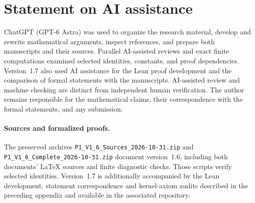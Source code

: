 \section*{Statement on AI assistance}

ChatGPT (GPT-6 Astra) was used to organize the research material,
develop and rewrite mathematical arguments, inspect references,
and prepare both manuscripts and their sources.
Parallel AI-assisted reviews and exact finite computations examined
selected identities, constants, and proof dependencies.
Version~1.7 also used AI assistance for the Lean proof development and
the comparison of formal statements with the manuscripts.
AI-assisted review and machine checking are distinct from independent
human verification. The author remains responsible for the mathematical
claims, their correspondence with the formal statements, and any submission.

\ifdefined\PoneTechnicalCompanion\else
\paragraph{Sources and formalized proofs.}
The preserved archives \nolinkurl{P1_V1_6_Sources_2026-10-31.zip} and
\nolinkurl{P1_V1_6_Complete_2026-10-31.zip} document version~1.6,
including both documents' LaTeX sources and finite diagnostic checks.
Those scripts verify selected identities.
Version~1.7 is additionally accompanied by the Lean development,
statement correspondence and kernel-axiom audits described in the
preceding appendix and available in the associated repository.
\fi
